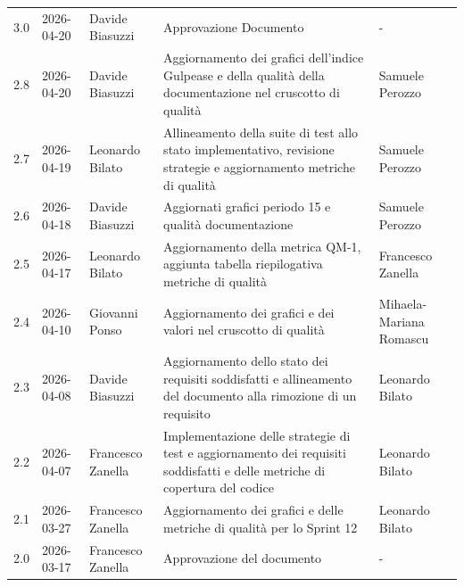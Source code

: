 \documentclass[a4paper,11pt,oneside]{scrartcl}
\begin{document}
{\begin{longtable}{@{}llp{}p{}p{}@{}}
        3.0               & 2026-04-20    & Davide Biasuzzi         & Approvazione Documento                                                                                                                              & -                       \\
        2.8               & 2026-04-20    & Davide Biasuzzi         & Aggiornamento dei grafici dell'indice Gulpease e della qualità della documentazione nel cruscotto di qualità         & Samuele Perozzo         \\
        2.7               & 2026-04-19    & Leonardo Bilato         & Allineamento della suite di test allo stato implementativo, revisione strategie e aggiornamento metriche di qualità & Samuele Perozzo         \\
        2.6               & 2026-04-18    & Davide Biasuzzi         & Aggiornati grafici periodo 15 e qualità documentazione & Samuele Perozzo     \\
        2.5               & 2026-04-17    & Leonardo Bilato         & Aggiornamento della metrica QM-1, aggiunta tabella riepilogativa metriche di qualità                                                             & Francesco Zanella     \\
        2.4               & 2026-04-10    & Giovanni Ponso          & Aggiornamento dei grafici e dei valori nel cruscotto di qualità                                                                                          & Mihaela-Mariana Romascu \\
        2.3               & 2026-04-08    & Davide Biasuzzi         & Aggiornamento dello stato dei requisiti soddisfatti e allineamento del documento alla rimozione di un requisito                                          & Leonardo Bilato         \\
        2.2               & 2026-04-07    & Francesco Zanella       & Implementazione delle strategie di test e aggiornamento dei requisiti soddisfatti e delle metriche di copertura del codice                               & Leonardo Bilato         \\
        2.1               & 2026-03-27    & Francesco Zanella       & Aggiornamento dei grafici e delle metriche di qualità per lo Sprint 12                                                                                   & Leonardo Bilato         \\
        2.0               & 2026-03-17    & Francesco Zanella       & Approvazione del documento                                                                                                                               & -                       \\

\end{longtable}}
\end{document}
